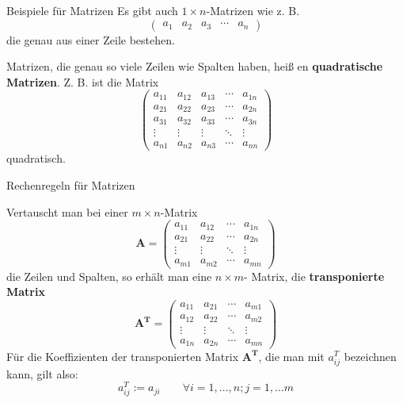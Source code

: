 \begin{frame}{Beispiele für Matrizen}
	Es gibt auch $1 \times n$-Matrizen wie z. B.
			\[
			\begin{pmatrix}
			a_1 & a_2 & a_3 & \cdots & a_n
			\end{pmatrix}
			\]die genau aus einer Zeile bestehen.
			
			Matrizen, die genau so viele Zeilen wie Spalten haben, heiß en \textbf{quadratische Matrizen}. Z. B. ist die Matrix
			\[	
	\begin{pmatrix}
		a_{11} & a_{12} & a_{13} & \cdots & a_{1n} \\
		a_{21} & a_{22} & a_{23} & \cdots & a_{2n} \\
		a_{31} & a_{32} & a_{33} & \cdots & a_{3n} \\
		\vdots & \vdots & \vdots  & \ddots & \vdots \\
		a_{n1} & a_{n2} & a_{n3} & \cdots & a_{nn}
	\end{pmatrix}
	\]
	quadratisch.
\end{frame}

\begin{frame}{Rechenregeln für Matrizen}
	\footnotesize{
	\begin{definition}
		Vertauscht man bei einer $m \times n$-Matrix
				\[
				\pmb{A} = \begin{pmatrix}
				a_{11} & a_{12}  & \cdots & a_{1n} \\
				a_{21} & a_{22}  & \cdots & a_{2n} \\
				\vdots & \vdots   & \ddots & \vdots \\
				a_{m1} & a_{m2}  & \cdots & a_{mn}
				\end{pmatrix}
				\]
		die Zeilen und Spalten, so erhält man eine $n \times m$- Matrix, die \textbf{transponierte Matrix}
				\[
				\pmb{A^{T}} = \begin{pmatrix}
				a_{11} & a_{21}  & \cdots & a_{m1} \\
				a_{12} & a_{22}  & \cdots & a_{m2} \\
				\vdots & \vdots   & \ddots & \vdots \\
				a_{1n} & a_{2n}  & \cdots & a_{mn}
				\end{pmatrix}
				\]
		Für die Koeffizienten der transponierten Matrix $\pmb{A^{T}}$, die man mit $a^{T}_{ij}$ bezeichnen kann, gilt also:
		\[
			a^{T}_{ij} := a_{ji} \qquad \forall i=1, \ldots, n; j=1, \ldots m
		\]
				
	\end{definition}
}
\end{frame}

